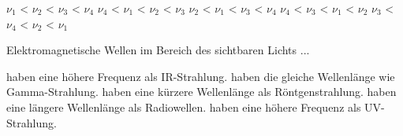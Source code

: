 \documentclass[11pt]{exam}
\begin{document}
\begin{questions}
\begin{choices}
	\choice \( \nu_1 \) < \( \nu_2 \) < \( \nu_3 \) < \( \nu_4 \)
	\choice \( \nu_4 \) < \( \nu_1 \) < \( \nu_2 \) < \( \nu_3 \)
	\choice \( \nu_2 \) < \( \nu_1 \) < \( \nu_3 \) < \( \nu_4 \)
	\choice \( \nu_4 \) < \( \nu_3 \) < \( \nu_1 \) < \( \nu_2 \)
	\choice \( \nu_3 \) < \( \nu_4 \) < \( \nu_2 \) < \( \nu_1 \)
\end{choices}

\vspace{3mm}\question Elektromagnetische Wellen im Bereich des sichtbaren Lichts ...

\begin{choices}
	\choice haben eine höhere Frequenz als IR-Strahlung.
	\choice haben die gleiche Wellenlänge wie Gamma-Strahlung.
	\choice haben eine kürzere Wellenlänge als Röntgenstrahlung.
	\choice haben eine längere Wellenlänge als Radiowellen.
	\choice haben eine höhere Frequenz als UV-Strahlung.
\end{choices}

\vspace{3mm}\end{questions}
\end{document}

